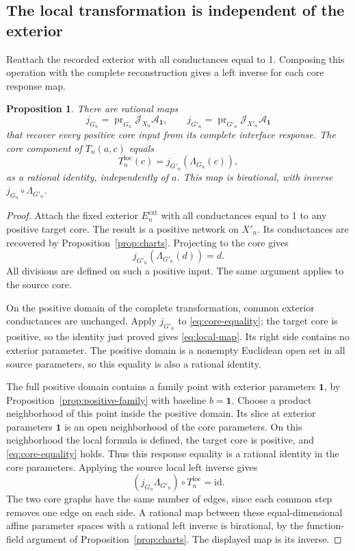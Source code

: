 \documentclass[11pt]{article}
\newtheorem{proposition}[theorem]{Proposition}
\theoremstyle{definition}
\newcommand{\one}{\mathbf 1}
\newcommand{\chart}{\mathcal J}
\newcommand{\pr}{\operatorname{pr}}
\begin{document}
\subsection{The local transformation is independent of the exterior}

Reattach the recorded exterior with all conductances equal to 1.
Composing this operation with the complete reconstruction gives a
left inverse for each core response map.

\begin{proposition}
\label{prop:local-independence}
There are rational maps
\[
 j_{G_n}=\pr_{G_n}\chart_{X_n}\mathcal A_{\one},\qquad
 j_{G'_n}=\pr_{G'_n}\chart_{X'_n}\mathcal A_{\one}
\]
that recover every positive core input from its complete
interface response. The core component of \(T_n(a,c)\) equals
\begin{equation}
 T_n^{\mathrm{loc}}(c)=j_{G'_n}(\Lambda_{G_n}(c)),
 \label{eq:local-map}
\end{equation}
as a rational identity, independently of \(a\).
This map is birational, with inverse
\(j_{G_n}\circ\Lambda_{G'_n}\).
\end{proposition}
\begin{proof}
Attach the fixed exterior \(E_n^{\mathrm{ext}}\) with all conductances equal to 1
to any positive target core.
The result is a positive network on \(X'_n\).
Its conductances are recovered by Proposition~\ref{prop:charts}.
Projecting to the core gives
\[
 j_{G'_n}(\Lambda_{G'_n}(d))=d.
\]
All divisions are defined on such a positive input.
The same argument applies to the source core.

On the positive domain of the complete transformation, common
exterior conductances are unchanged. Apply \(j_{G'_n}\) to
\eqref{eq:core-equality}; the target core is positive, so the identity
just proved gives \eqref{eq:local-map}.
Its right side contains no exterior parameter.
The positive domain is a nonempty Euclidean open set in all source
parameters, so this equality is also a rational identity.

The full positive domain contains a family point with exterior
parameters \(\one\), by Proposition~\ref{prop:positive-family}
with baseline \(b=\one\).
Choose a product neighborhood of this point inside the positive domain.
Its slice at exterior parameters \(\one\) is an open neighborhood
of the core parameters.
On this neighborhood the local formula is defined, the target
core is positive, and \eqref{eq:core-equality} holds.
Thus this response equality is a rational identity in the core parameters.
Applying the source local left inverse gives
\[
 (j_{G_n}\Lambda_{G'_n})\circ T_n^{\mathrm{loc}}=\mathrm{id}.
\]
The two core graphs have the same number of edges, since each common
step removes one edge on each side. A rational map between these
equal-dimensional affine parameter spaces with a rational left
inverse is birational, by the function-field argument of
Proposition~\ref{prop:charts}. The displayed map is its inverse.
\end{proof}
\end{document}
